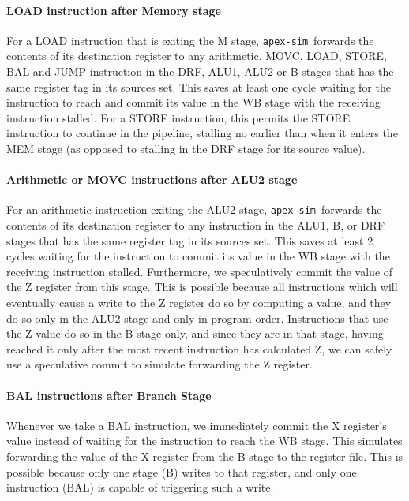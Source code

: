 \documentclass[12pt]{article}
\newcommand{\codename}[0]{\texttt{apex-sim}~}
\begin{document}
\paragraph{LOAD instruction after Memory stage}
For a LOAD instruction that is exiting the M stage, \codename forwards the contents of its destination register to any arithmetic, MOVC, LOAD, STORE, BAL and JUMP instruction in the DRF, ALU1, ALU2 or B stages that has the same register tag in its sources set. This saves at least one cycle waiting for the instruction to reach and commit its value in the WB stage with the receiving instruction stalled. For a STORE instruction, this permits the STORE instruction to continue in the pipeline, stalling no earlier than when it enters the MEM stage (as opposed to stalling in the DRF stage for its source value).

\paragraph{Arithmetic or MOVC instructions after ALU2 stage}
For an arithmetic instruction exiting the ALU2 stage, \codename forwards the contents of its destination register to any instruction in the ALU1, B, or DRF stages that has the same register tag in its sources set. This saves at least 2 cycles waiting for the instruction to commit its value in the WB stage with the receiving instruction stalled. Furthermore, we speculatively commit the value of the Z register from this stage. This is possible because all instructions which will eventually cause a write to the Z register do so by computing a value, and they do so only in the ALU2 stage and only in program order. Instructions that use the Z value do so in the B stage only, and since they are in that stage, having reached it only after the most recent instruction has calculated Z, we can safely use a speculative commit to simulate forwarding the Z register.

\paragraph{BAL instructions after Branch Stage}
Whenever we take a BAL instruction, we immediately commit the X register's value instead of waiting for the instruction to reach the WB stage. This simulates forwarding the value of the X register from the B stage to the register file. This is possible because only one stage (B) writes to that register, and only one instruction (BAL) is capable of triggering such a write.
\end{document}
